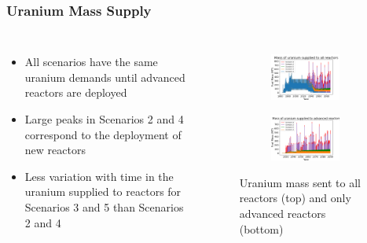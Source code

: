 \begin{frame}
    \frametitle{Uranium Mass Supply}
    \begin{columns}
        \column[t]{5cm}
            \begin{itemize}
                \item All scenarios have the same uranium demands until 
                      advanced reactors are deployed
                \item Large peaks in Scenarios 2 and 4 correspond to the 
                      deployment of new reactors
                \item Less variation with time in the uranium supplied to reactors
                      for Scenarios 3 and 5 than Scenarios 2 and 4
            \end{itemize}
        \column[t]{5cm}
        \vspace{-0.8cm}
        \begin{figure}
            \centering 
            \begin{subfigure}
                \centering
                \includegraphics[scale=0.3]{figures/fuelsupply_scenarios_all.png}
                \label{fig:fuel_all}
            \end{subfigure}
            \begin{subfigure}
                \centering
                \includegraphics[scale=0.3]{figures/advancedRX_fuelsupply_scenarios_2-5.png}
                \label{fig:fuel_advancedRX}
            \end{subfigure}
            \caption{Uranium mass sent to all reactors (top)
            and only advanced reactors (bottom)}
            \label{fig:fuel}
        \end{figure}
    \end{columns}
    


\end{frame}
